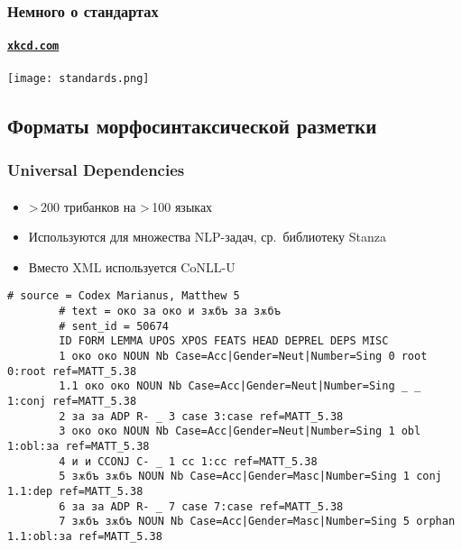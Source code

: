 \begin{frame}
    \frametitle{Немного о стандартах}
    \framesubtitle{\href{https://xkcd.com/927}{\texttt{xkcd.com}}}
    \centering
    \texttt{[image: standards.png]}
\end{frame}

\subsection{Форматы морфосинтаксической разметки}


\begin{frame}[fragile]
    \frametitle{Universal Dependencies}
    \framesubtitle{\autocite{universal_dependencies}}

    \begin{itemize}
        \item >\,200 трибанков на >\,100 языках
        \item Используются для множества NLP-задач, ср.\ библиотеку Stanza
        \item Вместо XML используется CoNLL-U
    \end{itemize}

    \vfill

    \begin{Verbatim}[fontsize=\scriptsize, gobble=8]
        # source = Codex Marianus, Matthew 5
        # text = око за око и зѫбъ за зѫбъ
        # sent_id = 50674
        ID FORM LEMMA UPOS XPOS FEATS HEAD DEPREL DEPS MISC
        1 око око NOUN Nb Case=Acc|Gender=Neut|Number=Sing 0 root 0:root ref=MATT_5.38
        1.1 око око NOUN Nb Case=Acc|Gender=Neut|Number=Sing _ _ 1:conj ref=MATT_5.38
        2 за за ADP R- _ 3 case 3:case ref=MATT_5.38
        3 око око NOUN Nb Case=Acc|Gender=Neut|Number=Sing 1 obl 1:obl:за ref=MATT_5.38
        4 и и CCONJ C- _ 1 cc 1:cc ref=MATT_5.38
        5 зѫбъ зѫбъ NOUN Nb Case=Acc|Gender=Masc|Number=Sing 1 conj 1.1:dep ref=MATT_5.38
        6 за за ADP R- _ 7 case 7:case ref=MATT_5.38
        7 зѫбъ зѫбъ NOUN Nb Case=Acc|Gender=Masc|Number=Sing 5 orphan 1.1:obl:за ref=MATT_5.38
    \end{Verbatim}
\end{frame}

